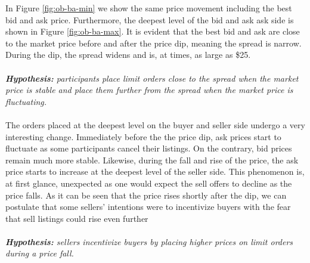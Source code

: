 In Figure \ref{fig:ob-ba-min} we show the same price movement including the best bid and ask price.
Furthermore, the deepest level of the bid and ask ask side is shown in Figure \ref{fig:ob-ba-max}.
It is evident that the best bid and ask are close to the market price before and after the price dip, meaning the spread is narrow.
During the dip, the spread widens and is, at times, as large as \$25.
\\
\\
\textit{\textbf{Hypothesis:} participants place limit orders close to the spread when the market price is stable and place them further from the spread when the market price is fluctuating.}
\\
\\
The orders placed at the deepest level on the buyer and seller side undergo a very interesting change.
Immediately before the the price dip, ask prices start to fluctuate as some participants cancel their listings.
On the contrary, bid prices remain much more stable.
Likewise, during the fall and rise of the price, the ask price starts to increase at the deepest level of the seller side. 
This phenomenon is, at first glance, unexpected as one would expect the sell offers to decline as the price falls.
As it can be seen that the price rises shortly after the dip, we can postulate that some sellers' intentions were to incentivize buyers with the fear that sell listings could rise even further
\\
\\
\textit{\textbf{Hypothesis:} sellers incentivize buyers by placing higher prices on limit orders during a price fall.}
%
